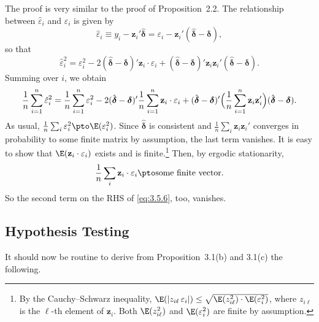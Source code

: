 The proof is very similar to the proof of Proposition~2.2.  The relationship between
$\hat{\varepsilon}_i$ and $\varepsilon_i$ is given by
\begin{equation}
  \hat{\varepsilon}_i \equiv y_i - \mathbf{z}_i' \hat{\boldsymbol{\delta}}
  = \varepsilon_i - \mathbf{z}_i'(\hat{\boldsymbol{\delta}} - \boldsymbol{\delta}),
  \label{eq:3.5.4}
\end{equation}
so that
\begin{equation}
  \hat{\varepsilon}_i^2 = \varepsilon_i^2
  - 2(\hat{\boldsymbol{\delta}} - \boldsymbol{\delta})' \mathbf{z}_i \cdot \varepsilon_i
  + (\hat{\boldsymbol{\delta}} - \boldsymbol{\delta})' \mathbf{z}_i \mathbf{z}_i'
    (\hat{\boldsymbol{\delta}} - \boldsymbol{\delta}).
  \label{eq:3.5.5}
\end{equation}
Summing over $i$, we obtain
\begin{equation}
  \frac{1}{n} \sum_{i=1}^{n} \hat{\varepsilon}_i^2
  = \frac{1}{n} \sum_{i=1}^{n} \varepsilon_i^2
  - 2(\hat{\boldsymbol{\delta}} - \boldsymbol{\delta})'
    \frac{1}{n} \sum_{i=1}^{n} \mathbf{z}_i \cdot \varepsilon_i
  + (\hat{\boldsymbol{\delta}} - \boldsymbol{\delta})'
    \Bigl(\frac{1}{n} \sum_{i=1}^{n} \mathbf{z}_i \mathbf{z}_i'\Bigr)
    (\hat{\boldsymbol{\delta}} - \boldsymbol{\delta}).
  \label{eq:3.5.6}
\end{equation}
As usual, $\frac{1}{n} \sum_i \varepsilon_i^2 \pto \E(\varepsilon_i^2)$.
Since $\hat{\boldsymbol{\delta}}$ is consistent and
$\frac{1}{n} \sum_i \mathbf{z}_i \mathbf{z}_i'$ converges in probability to some finite matrix by assumption,
the last term vanishes.  It is easy to show that $\E(\mathbf{z}_i \cdot \varepsilon_i)$ exists and is
finite.\footnote{By the Cauchy--Schwarz inequality,
$\E(|z_{i\ell}\,\varepsilon_i|) \leq \sqrt{\E(z_{i\ell}^2) \cdot \E(\varepsilon_i^2)}$,
where $z_{i\ell}$ is the $\ell$-th element of $\mathbf{z}_i$.  Both $\E(z_{i\ell}^2)$ and
$\E(\varepsilon_i^2)$ are finite by assumption.}  Then, by ergodic stationarity,
\[
  \frac{1}{n} \sum_i \mathbf{z}_i \cdot \varepsilon_i \pto \text{some finite vector.}
\]
So the second term on the RHS of \eqref{eq:3.5.6}, too, vanishes.

\subsection*{Hypothesis Testing}

It should now be routine to derive from Proposition~3.1(b) and 3.1(c) the following.

